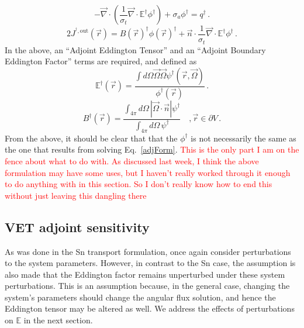 \documentclass{article}
\newcommand{\vr}{\vec{r}}
\newcommand{\vO}{\vec{\Omega}}
\renewcommand{\div}{\vec{\nabla} \cdot}
\newcommand{\bound}{\partial V}
\newcommand{\vn}{\vec{n}}
\newcommand{\Edd}{\mathbb{E}}
\newcommand{\BEdd}{B}
\newcommand{\sigt}{\sigma_t}
\newcommand{\siga}{\sigma_a}
\newcommand{\scalSource}{q}
\newcommand{\comment}[2]{\marginpar{\textcolor{#2}{$\star$}}\textcolor{#2}{#1}\newline}
\newcommand{\iwh}[1]{\comment{#1}{red}}
\newcommand{\iwh}[1]{\phantom{a}}
\begin{document}
\begin{equation}
\label{TranAdjVEFForm}
- \div \left( \frac{1}{\sigt}\div \Edd^\dag \phi^\dag  \right) + \siga \phi^\dag  = \scalSource^\dag  \,.
\end{equation}
\begin{equation}
2 J^{^\dag,\text{out}}(\vr) = \BEdd(\vr)^\dag \phi(\vr)^\dag  + \vn \cdot \frac{1}{\sigt} \div \Edd^\dag  \phi^\dag  \,.
\end{equation}
In the above, an ``Adjoint Eddington Tensor'' and an ``Adjoint Boundary Eddington Factor'' terms are required, and defined as
\begin{equation}
\label{AdjEddDef}
\Edd^\dag(\vr)=\frac{\int d\Omega \vO \vO \psi^\dag(\vr,\vO)}{\phi^\dag(\vr)} \, .
\end{equation} 
\begin{equation}
\BEdd^\dag(\vr) = \frac{\int_{4 \pi} d\Omega \, | \vO \cdot \vn | \psi^\dag}{\int_{4\pi} d\Omega \, \psi^\dag} \quad , \vr \in \bound \,.
\end{equation}
From the above, it should be clear that that the $\phi^\dag$ is not necessarily the same as the one that results from solving Eq.~\eqref{adjForm}.
\iwh{This is the only part I am on the fence about what to do with. As discussed last week, I think the above formulation may have some uses, but I haven't really worked through it enough to do anything with in this section. So I don't really know how to end this without just leaving this dangling there}
\subsection{VET adjoint sensitivity}

As was done in the Sn transport formulation, once again consider perturbations to the system parameters. However, in contrast to the Sn case, the assumption is also made that the Eddington factor remains unperturbed under these system perturbations. This is an assumption because, in the general case, changing the system's parameters should change the angular flux solution, and hence
the Eddington tensor may be altered as well. We address the effects of perturbations on $\Edd$ in the next section.
\end{document}
